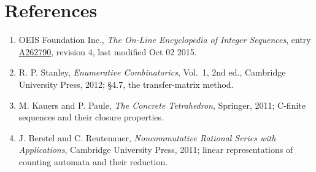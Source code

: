 \documentclass[11pt]{article}
\theoremstyle{definition}
\begin{document}
\section{References}

\begin{enumerate}

\item OEIS Foundation Inc., \emph{The On-Line Encyclopedia of Integer Sequences}, entry \href{https://oeis.org/A262790}{A262790}, revision 4, last modified Oct 02 2015.

\item R. P. Stanley, \emph{Enumerative Combinatorics}, Vol.~1, 2nd ed., Cambridge University Press, 2012; \S4.7, the transfer-matrix method.

\item M. Kauers and P. Paule, \emph{The Concrete Tetrahedron}, Springer, 2011; C-finite sequences and their closure properties.

\item J. Berstel and C. Reutenauer, \emph{Noncommutative Rational Series with Applications}, Cambridge University Press, 2011; linear representations of counting automata and their reduction.

\end{enumerate}
\end{document}
